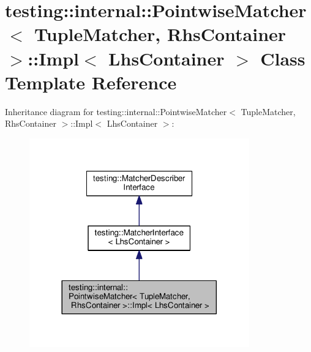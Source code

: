 \hypertarget{classtesting_1_1internal_1_1PointwiseMatcher_1_1Impl}{}\section{testing\+:\+:internal\+:\+:Pointwise\+Matcher$<$ Tuple\+Matcher, Rhs\+Container $>$\+:\+:Impl$<$ Lhs\+Container $>$ Class Template Reference}
\label{classtesting_1_1internal_1_1PointwiseMatcher_1_1Impl}


Inheritance diagram for testing\+:\+:internal\+:\+:Pointwise\+Matcher$<$ Tuple\+Matcher, Rhs\+Container $>$\+:\+:Impl$<$ Lhs\+Container $>$\+:\nopagebreak
\begin{figure}[H]
\begin{center}
\leavevmode
\includegraphics[width=269pt]{classtesting_1_1internal_1_1PointwiseMatcher_1_1Impl__inherit__graph}
\end{center}
\end{figure}


